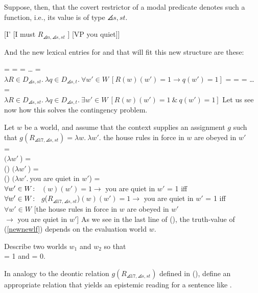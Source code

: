 Suppose, then, that the covert restrictor of a modal predicate denotes
such a function, i.e., its value is of type $\angles{s,st}$.

\ex \label{newnewlf} [I' [I must $R_{\angles{n,\angles{s,st}}}$ ] [VP you
quiet]] \xe

And the new lexical entries for  and 
that will fit this new structure are these:

\pex \a {} =  =  = \dots{} =\\
$\lambda R\in D_{\angles{s,st}}.\ \lambda q\in D_{\angles{s,t}}.\ \forall w'\in W\ [R(w)(w') =1 \rightarrow q(w')=1]$
\a {} =  =  = \dots{} =\\
$\lambda R\in D_{\angles{s,st}}.\ \lambda q\in D_{\angles{s,t}}.\ \exists w'\in
W\ [R(w)(w')=1\ \&\ q(w')=1]$ \xe
%
Let us see now how this solves the contingency problem.

\ex Let $w$ be a world, and assume that the context supplies an assignment $g$ such that $g(R_{\angles{17,\angles{s,st}}}) = \lambda w.\ \lambda w'.$ the house rules in force in $w$ are obeyed in $w'$\\[9pt]
 = \\
$(\lambda w'\ $) = \\
 () $(\lambda w'\ $) = \\
 () $(\lambda w'.\ $you are quiet in $w'$) = \\
$\forall w'\in W\colon\thinspace$ $(w)(w') =1 \rightarrow $ you are quiet
in $w'$ = 1 iff\\
$\forall w'\in W\colon\thinspace$ $g$({$R_{\angles{17,\angles{s,st}}}$})$(w)(w') =1 \rightarrow $ you are quiet
in $w'$ = 1 iff \\
$\forall w'\in W$ [the house rules in force in $w$ are obeyed in $w'$ \\
\null\hfill $\rightarrow$ you are quiet in $w'$] \xe
%
As we see in the last line of (\lastx), the truth-value of (\ref{newnewlf})
depends on the evaluation world $w$.
\begin{exercise}
	
	Describe two worlds $w_{1}$ and $w_{2}$ so that\\
	 = 1 and  = 0. \eex
\end{exercise}
\begin{exercise}
	
	In analogy to the deontic relation
  $g(R_{\angles{17,\angles{s,st}}})$ defined in (\lastx), define an
  appropriate relation that yields an epistemic reading for a sentence
  like . \eex
\end{exercise}

